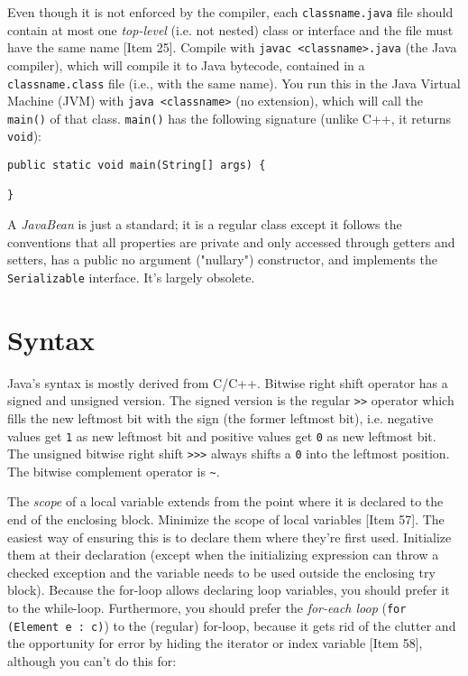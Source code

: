 \documentclass[8pt, table, xcdraw]{article}%
\begin{document}
Even though it is not enforced by the compiler, each \lstinline{classname.java} file should contain at most one \emph{top-level} (i.e. not nested) class or interface and the file must have the same name [Item 25]. Compile with \lstinline{javac <classname>.java} (the Java compiler), which will compile it to Java bytecode, contained in a \lstinline{classname.class} file (i.e., with the same name). You run this in the Java Virtual Machine (JVM) with \lstinline{java <classname>} (no extension), which will call the \lstinline{main()} of that class. \lstinline{main()} has the following signature (unlike C++, it returns \lstinline{void}):

\begin{lstlisting}
public static void main(String[] args) {

}
\end{lstlisting}

A \emph{JavaBean} is just a standard; it is a regular class except it follows the conventions that all properties are private and only accessed through getters and setters, has a public no argument ("nullary") constructor, and implements the \lstinline{Serializable} interface. It's largely obsolete.

\section{Syntax}

Java's syntax is mostly derived from C/C++. Bitwise right shift operator has a signed and unsigned version. The signed version is the regular \lstinline{>>} operator which fills the new leftmost bit with the sign (the former leftmost bit), i.e. negative values get \lstinline{1} as new leftmost bit and positive values get \lstinline{0} as new leftmost bit. The unsigned bitwise right shift \lstinline{>>>} always shifts a \lstinline{0} into the leftmost position. The bitwise complement operator is \lstinline{~}.

The \emph{scope} of a local variable extends from the point where it is declared to the end of the enclosing block. Minimize the scope of local variables [Item 57]. The easiest way of ensuring this is to declare them where they're first used. Initialize them at their declaration (except when the initializing expression can throw a checked exception and the variable needs to be used outside the enclosing try block). Because the for-loop allows declaring loop variables, you should prefer it to the while-loop. Furthermore, you should prefer the \emph{for-each loop} (\lstinline{for (Element e : c)}) to the (regular) for-loop, because it gets rid of the clutter and the opportunity for error by hiding the iterator or index variable [Item 58], although you can't do this for:
\end{document}

